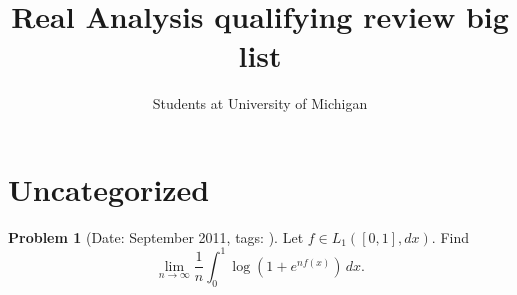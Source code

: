 \documentclass[11pt, notitlepage]{article}
\title{Real Analysis qualifying review big list}
\author{Students at University of Michigan}
\theoremstyle{definition}
\theoremstyle{definition}
\theoremstyle{definition}
\newtheorem{probstate}{Problem}
\theoremstyle{remark}
\newenvironment{problem}[2]{
    \begin{probstate}[Date: #1, tags: \texttt{#2}]
}
{
  \end{probstate}
}
\begin{document}
\maketitle

\tableofcontents

\section{Uncategorized}
\label{sec:uncategorized}

\begin{problem}{September 2011}{}
Let $f \in L_1([0,1], dx)$. Find
 \[
   \lim_{n \to \infty} \frac{1}{n}  \int_0^1 \log \left( 1+ e^{nf(x)} \right) \, dx.
 \]
\end{problem}
\end{document}
